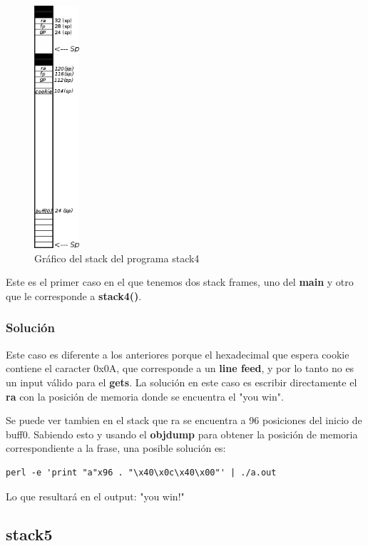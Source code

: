 \documentclass[a4paper,10pt]{article}
\begin{document}
\begin{figure}[h!]
	\centering
	\includegraphics[height=9cm]{./recursos/stack4.png}
	\caption{Gr\'afico del stack del programa stack4}
    \label{fig:stack4}
\end{figure}

Este es el primer caso en el que tenemos dos stack frames, uno del \textbf{main} y otro que le corresponde a \textbf{stack4()}. 

\subsubsection{Solución}

Este caso es diferente a los anteriores porque el hexadecimal que espera cookie contiene el caracter 0x0A, que corresponde a un \textbf{line feed}, y por lo tanto no es un input válido para el \textbf{gets}.
La solución en este caso es escribir directamente el \textbf{ra} con la posición de memoria donde se encuentra el "you win". 

Se puede ver tambien en el stack que ra se encuentra a 96 posiciones del inicio de buff0. Sabiendo esto y usando el \textbf{objdump} para obtener la posición de memoria correspondiente a la frase, una posible solución es:

\begin{lstlisting}
perl -e 'print "a"x96 . "\x40\x0c\x40\x00"' | ./a.out
\end{lstlisting}

\bigskip

Lo que resultará en el output: "you win!"

\subsection{stack5}
\end{document}

